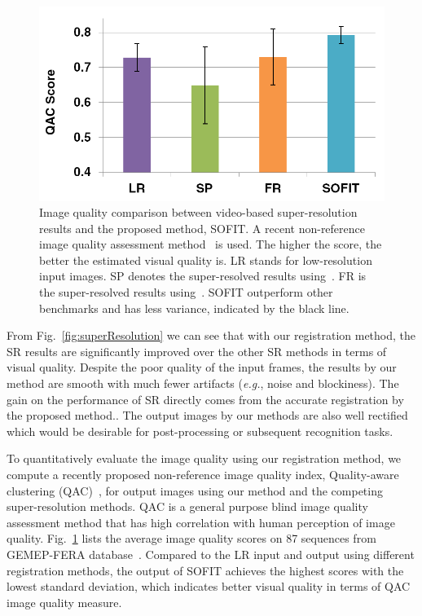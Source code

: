 \documentclass[review]{elsarticle}
\begin{document}
\begin{figure}[t]
	\centering
	\includegraphics[width=.8\columnwidth]{fig/SR_quant.png}
	\caption{Image quality comparison between video-based super-resolution results and the proposed method, SOFIT. A recent non-reference image quality assessment method~\cite{Xue_CVPR13} is used. The higher the score, the better the estimated visual quality is. LR stands for low-resolution input images. SP denotes the super-resolved results using~\cite{Keren_CVPR88}. FR is the super-resolved results using~\cite{Vandewalle06}. SOFIT outperform other benchmarks and has less variance, indicated by the black line. }
	\label{fig:SR_quant}
\end{figure}


From Fig.~\ref{fig:superResolution} we can see that with our registration method, the SR results are significantly improved over the other SR methods in terms of visual quality. Despite the poor quality of the input frames, the results by our method are smooth with much fewer artifacts (\textit{e.g.}, noise and blockiness). The gain on the performance of SR directly comes from the accurate registration by the proposed method.. The output images by our methods are also well rectified which would be desirable for post-processing or subsequent recognition tasks. 




To quantitatively evaluate the image quality using our registration method, we compute a recently proposed non-reference image quality index, Quality-aware clustering (QAC)~\cite{Xue_CVPR13}, for output images using our method and the competing super-resolution methods. QAC is a general purpose blind image quality assessment method that has high correlation with human perception of image quality. Fig.~\ref{fig:SR_quant} lists the average image quality scores on 87 sequences from GEMEP-FERA database~\cite{FERA11}. Compared to the LR input and output using different registration methods, the output of SOFIT achieves the highest scores with the lowest standard deviation, which indicates better visual quality in terms of QAC image quality measure.
\end{document}
